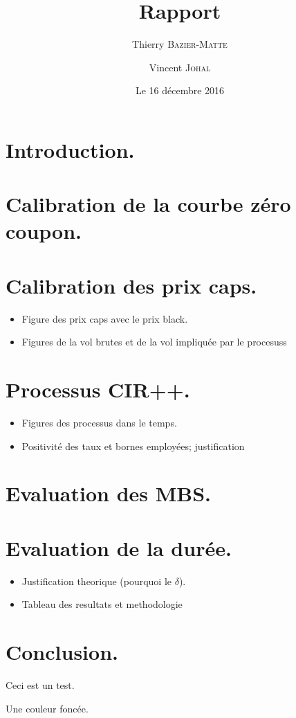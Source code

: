 \documentclass[10pt]{article}
\title{Rapport}
\author{Thierry \textsc{Bazier-Matte} \and Vincent \textsc{Johal}}
\date{Le 16 décembre 2016}
\begin{document}
\maketitle

\section{Introduction.}

\section{Calibration de la courbe zéro coupon.}




\section{Calibration des prix caps.}

\begin{itemize}
\item Figure des prix caps avec le prix black.
\item Figures de la vol brutes et de la vol impliquée par le procesuss
\end{itemize}

\section{Processus CIR++.}
\begin{itemize}
\item Figures des processus dans le temps.
\item Positivité des taux et bornes employées; justification
\end{itemize}

\section{Evaluation des MBS.}


\section{Evaluation de la durée.}
\begin{itemize}
\item Justification theorique (pourquoi le $\delta$).
\item Tableau des resultats et methodologie
\end{itemize}

\section{Conclusion.}

Ceci est un test.

Une couleur foncée.




\end{document}
